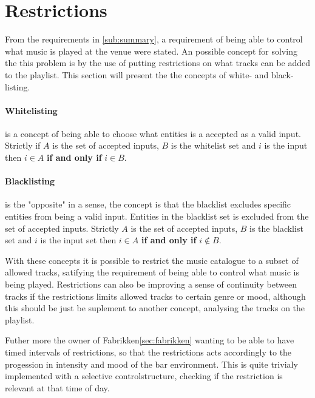 \section{Restrictions}
\label{sec:restrictions}

From the requirements in \cref{sub:summary}, a requirement of being able to control what music is played at the venue were stated. An possible concept for solving the this problem is by the use of putting restrictions on what tracks can be added to the playlist. This section will present the the concepts of white- and black-listing.

\paragraph{Whitelisting} is a concept of being able to choose what entities is a accepted as a valid input. Strictly if $A$ is the set of accepted inputs, $B$ is the whitelist set and $i$ is the input then $i \in A$ \textbf{if and only if} $i \in B$.

\paragraph{Blacklisting} is the "opposite" in a sense, the concept is that the blacklist excludes specific entities from being a valid input. Entities in the blacklist set is excluded from the set of accepted inputs. Strictly $A$ is the set of accepted inputs, $B$ is the blacklist set and $i$ is the input set then $i \in A$ \textbf{if and only if} $i \notin B$.

With these concepts it is possible to restrict the music catalogue to a subset of allowed tracks, satifying the requirement of being able to control what music is being played. Restrictions can also be improving a sense of continuity between tracks if the restrictions limits allowed tracks to certain genre or mood, although this should be just be suplement to another concept, analysing the tracks on the playlist.

Futher more the owner of Fabrikken\cref{sec:fabrikken} wanting to be able to have timed intervals of restrictions, so that the restrictions acts accordingly to the progession in intensity and mood of the bar environment. This is quite trivialy implemented with a selective controlstructure, checking if the restriction is relevant at that time of day.